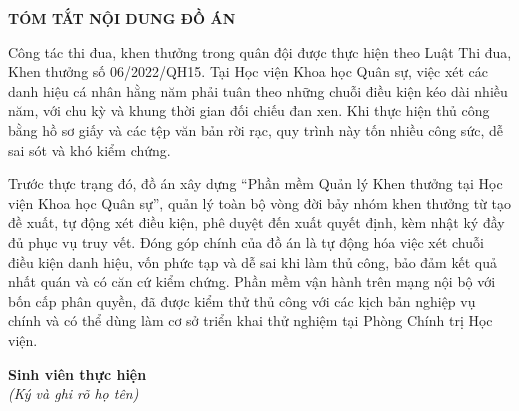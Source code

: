\documentclass[../DoAn.tex]{subfiles}
\begin{document}
\begin{center}
    \Large{\textbf{TÓM TẮT NỘI DUNG ĐỒ ÁN}}\\
\end{center}
\vspace{1cm}

Công tác thi đua, khen thưởng trong quân đội được thực hiện theo Luật Thi đua, Khen thưởng số 06/2022/QH15. Tại Học viện Khoa học Quân sự, việc xét các danh hiệu cá nhân hằng năm phải tuân theo những chuỗi điều kiện kéo dài nhiều năm, với chu kỳ và khung thời gian đối chiếu đan xen. Khi thực hiện thủ công bằng hồ sơ giấy và các tệp văn bản rời rạc, quy trình này tốn nhiều công sức, dễ sai sót và khó kiểm chứng.

Trước thực trạng đó, đồ án xây dựng ``Phần mềm Quản lý Khen thưởng tại Học viện Khoa học Quân sự'', quản lý toàn bộ vòng đời bảy nhóm khen thưởng từ tạo đề xuất, tự động xét điều kiện, phê duyệt đến xuất quyết định, kèm nhật ký đầy đủ phục vụ truy vết. Đóng góp chính của đồ án là tự động hóa việc xét chuỗi điều kiện danh hiệu, vốn phức tạp và dễ sai khi làm thủ công, bảo đảm kết quả nhất quán và có căn cứ kiểm chứng. Phần mềm vận hành trên mạng nội bộ với bốn cấp phân quyền, đã được kiểm thử thủ công với các kịch bản nghiệp vụ chính và có thể dùng làm cơ sở triển khai thử nghiệm tại Phòng Chính trị Học viện.

\vspace{1cm}
\begin{flushright}
    \textbf{Sinh viên thực hiện}\\
    \textit{(Ký và ghi rõ họ tên)}
\end{flushright}
\end{document}
